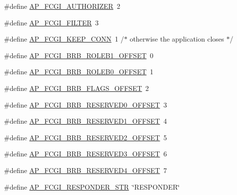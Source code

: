 \begin{DoxyCompactItemize}
\#define \hyperlink{group__APACHE__CORE__FASTCGI_ga1ee0dcb23aadc2ae68ee34296068de1e}{A\+P\+\_\+\+F\+C\+G\+I\+\_\+\+A\+U\+T\+H\+O\+R\+I\+Z\+ER}~2
\item 
\#define \hyperlink{group__APACHE__CORE__FASTCGI_gae8a0d6abb7fb95810208612bd67830e9}{A\+P\+\_\+\+F\+C\+G\+I\+\_\+\+F\+I\+L\+T\+ER}~3
\item 
\#define \hyperlink{group__APACHE__CORE__FASTCGI_gacbd893950a05972ee4e631c9a1054a88}{A\+P\+\_\+\+F\+C\+G\+I\+\_\+\+K\+E\+E\+P\+\_\+\+C\+O\+NN}~1  /$\ast$ otherwise the application closes $\ast$/
\item 
\#define \hyperlink{group__APACHE__CORE__FASTCGI_ga02de1d85eb7172c03af8f9443905b60c}{A\+P\+\_\+\+F\+C\+G\+I\+\_\+\+B\+R\+B\+\_\+\+R\+O\+L\+E\+B1\+\_\+\+O\+F\+F\+S\+ET}~0
\item 
\#define \hyperlink{group__APACHE__CORE__FASTCGI_gafe26e1fd1e94ebd45adf01db7c66ee86}{A\+P\+\_\+\+F\+C\+G\+I\+\_\+\+B\+R\+B\+\_\+\+R\+O\+L\+E\+B0\+\_\+\+O\+F\+F\+S\+ET}~1
\item 
\#define \hyperlink{group__APACHE__CORE__FASTCGI_ga6a31cfe95aaf1202b75628b10e80008f}{A\+P\+\_\+\+F\+C\+G\+I\+\_\+\+B\+R\+B\+\_\+\+F\+L\+A\+G\+S\+\_\+\+O\+F\+F\+S\+ET}~2
\item 
\#define \hyperlink{group__APACHE__CORE__FASTCGI_ga7f7772d53edd0b63d5f82db637c292da}{A\+P\+\_\+\+F\+C\+G\+I\+\_\+\+B\+R\+B\+\_\+\+R\+E\+S\+E\+R\+V\+E\+D0\+\_\+\+O\+F\+F\+S\+ET}~3
\item 
\#define \hyperlink{group__APACHE__CORE__FASTCGI_gae48ada3a2e88a3baafe64aa79cbd9456}{A\+P\+\_\+\+F\+C\+G\+I\+\_\+\+B\+R\+B\+\_\+\+R\+E\+S\+E\+R\+V\+E\+D1\+\_\+\+O\+F\+F\+S\+ET}~4
\item 
\#define \hyperlink{group__APACHE__CORE__FASTCGI_ga3621353935dfd54f5ece9cf313922519}{A\+P\+\_\+\+F\+C\+G\+I\+\_\+\+B\+R\+B\+\_\+\+R\+E\+S\+E\+R\+V\+E\+D2\+\_\+\+O\+F\+F\+S\+ET}~5
\item 
\#define \hyperlink{group__APACHE__CORE__FASTCGI_ga2ad7e16e06a0e5e1fcc88da26076a3cd}{A\+P\+\_\+\+F\+C\+G\+I\+\_\+\+B\+R\+B\+\_\+\+R\+E\+S\+E\+R\+V\+E\+D3\+\_\+\+O\+F\+F\+S\+ET}~6
\item 
\#define \hyperlink{group__APACHE__CORE__FASTCGI_ga7c0bd4f9ed3bb1cbd420b659f034d1d9}{A\+P\+\_\+\+F\+C\+G\+I\+\_\+\+B\+R\+B\+\_\+\+R\+E\+S\+E\+R\+V\+E\+D4\+\_\+\+O\+F\+F\+S\+ET}~7
\item 
\#define \hyperlink{group__APACHE__CORE__FASTCGI_ga80f7d224440602561caf56f046622234}{A\+P\+\_\+\+F\+C\+G\+I\+\_\+\+R\+E\+S\+P\+O\+N\+D\+E\+R\+\_\+\+S\+TR}~\char`\"{}R\+E\+S\+P\+O\+N\+D\+ER\char`\"{}
\item 

\end{DoxyCompactItemize}
